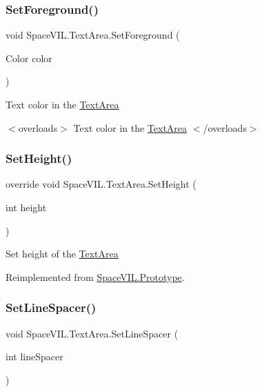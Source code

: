 \subsubsection{\texorpdfstring{Set\+Foreground()}{SetForeground()}}
{\footnotesize\ttfamily void Space\+V\+I\+L.\+Text\+Area.\+Set\+Foreground (\begin{DoxyParamCaption}\item[{Color}]{color }\end{DoxyParamCaption})}



Text color in the \mbox{\hyperlink{class_space_v_i_l_1_1_text_area}{Text\+Area}} 

$<$overloads$>$ Text color in the \mbox{\hyperlink{class_space_v_i_l_1_1_text_area}{Text\+Area}} $<$/overloads$>$ \mbox{\label{class_space_v_i_l_1_1_text_area_abb58c3f9396680f5d2c7f238c0d6e0bb}} 
\subsubsection{\texorpdfstring{Set\+Height()}{SetHeight()}}
{\footnotesize\ttfamily override void Space\+V\+I\+L.\+Text\+Area.\+Set\+Height (\begin{DoxyParamCaption}\item[{int}]{height }\end{DoxyParamCaption})\hspace{0.3cm}{\ttfamily [virtual]}}



Set height of the \mbox{\hyperlink{class_space_v_i_l_1_1_text_area}{Text\+Area}} 



Reimplemented from \mbox{\hyperlink{class_space_v_i_l_1_1_prototype_adc0adcbd1c3800d9525798ba7be5832a}{Space\+V\+I\+L.\+Prototype}}.

\mbox{\label{class_space_v_i_l_1_1_text_area_a133db6e0dc1fccf3e92d4044d9a16df0}} 
\subsubsection{\texorpdfstring{Set\+Line\+Spacer()}{SetLineSpacer()}}
{\footnotesize\ttfamily void Space\+V\+I\+L.\+Text\+Area.\+Set\+Line\+Spacer (\begin{DoxyParamCaption}\item[{int}]{line\+Spacer }\end{DoxyParamCaption})}



